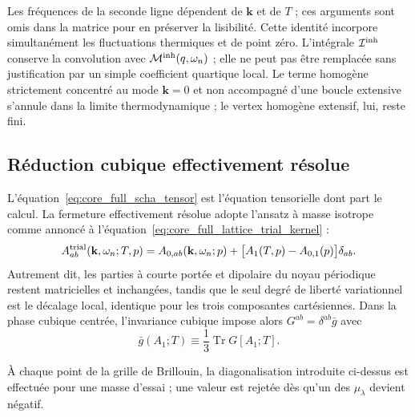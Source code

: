 Les fréquences de la seconde ligne dépendent de $\mathbf k$ et de $T$ ; ces
arguments sont omis dans la matrice pour en préserver la lisibilité. Cette
identité incorpore simultanément les fluctuations thermiques et de point zéro.
L'intégrale $\mathcal I^{\rm inh}$ conserve la convolution avec
$\mathcal M^{\rm inh}(q,\omega_n)$ ; elle ne peut pas être remplacée sans
justification par un simple coefficient quartique local. Le terme homogène
strictement concentré au mode $\mathbf k=0$ et non accompagné d'une boucle
extensive s'annule dans la limite thermodynamique ; le vertex homogène extensif,
lui, reste fini.

\subsection{Réduction cubique effectivement résolue}

L'équation~\eqref{eq:core_full_scha_tensor} est l'équation tensorielle dont part le
calcul. La fermeture effectivement résolue adopte l'ansatz à masse isotrope
comme annoncé à l'équation~\eqref{eq:core_full_lattice_trial_kernel} :
\begin{equation}
A^{\rm trial}_{ab}(\mathbf k,\omega_n;T,p)
=A_{0,ab}(\mathbf k,\omega_n;p)
+\big[A_1(T,p)-A_{0,1}(p)\big]\delta_{ab}.
\label{eq:core_isotropic_mass_ansatz}
\end{equation}
Autrement dit, les parties à courte portée et dipolaire du noyau périodique
restent matricielles et inchangées, tandis que le seul degré de liberté
variationnel est le décalage local, identique pour les trois composantes
cartésiennes. Dans la phase cubique centrée, l'invariance cubique impose alors
$G^{ab}=\delta^{ab}\bar g$ avec
\begin{equation}
\bar g(A_1;T)\equiv\frac13\operatorname{Tr}G[A_1;T].
\label{eq:core_scalar_loop_definition}
\end{equation}

À chaque point de la grille de Brillouin, la
diagonalisation introduite ci-dessus est effectuée pour une masse d'essai ; une
valeur est rejetée dès qu'un des $\mu_\lambda$ devient négatif.

